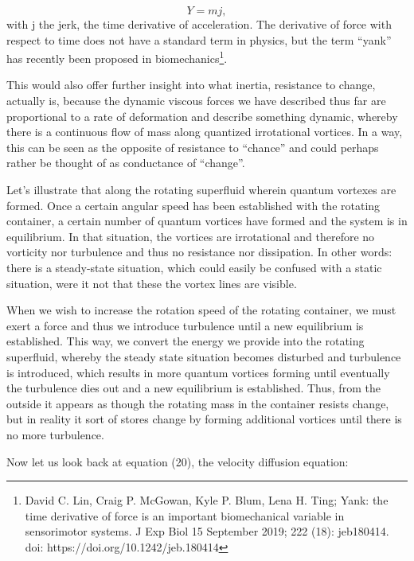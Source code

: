 \documentclass{article}
\begin{document}
\begin{equation}
Y=mj,
\end{equation}
with j the jerk, the time derivative of acceleration. The derivative of force with respect to time does not have a
standard term in physics, but the term ``yank'' has recently been proposed in biomechanics\footnote{ David C. Lin,
Craig P. McGowan, Kyle P. Blum, Lena H. Ting; Yank: the time derivative of force is an important biomechanical variable
in sensorimotor systems. J Exp Biol 15 September 2019; 222 (18): jeb180414. doi: https://doi.org/10.1242/jeb.180414
\par }.

This would also offer further insight into what inertia, resistance to {\textquotedbl}change{\textquotedbl}, actually
is, because the dynamic viscous forces we have described thus far are proportional to a rate of deformation and
describe something dynamic, whereby there is a continuous flow of mass  along quantized irrotational vortices. In a
way, this can be seen as the opposite of resistance to ``chance'' and could perhaps rather be thought of as conductance
of ``change''.

Let's illustrate that along the rotating superfluid wherein quantum vortexes are formed. Once a certain angular speed
has been established with the rotating container, a certain number of quantum vortices have formed and the system is in
equilibrium. In that situation, the vortices are irrotational and therefore no vorticity nor turbulence and thus no
resistance nor dissipation. In other words: there is a steady-state situation, which could easily be confused with a
{\textquotedbl}static{\textquotedbl} situation, were it not that these the vortex lines are visible.

When we wish to increase the rotation speed of the rotating container, we must exert a
{\textquotedbl}force{\textquotedbl} and thus we introduce turbulence until a new equilibrium is established. This way,
we convert the energy we provide into the rotating superfluid, whereby the steady state situation becomes disturbed and
turbulence is introduced, which results in more quantum vortices forming until eventually the turbulence dies out and a
new equilibrium is established. Thus, from the outside it appears as though the rotating mass in the container resists
change, but in reality it sort of stores {\textquotedbl}change{\textquotedbl} by forming additional vortices until
there is no more turbulence.

Now let us look back at equation (20),  the velocity diffusion equation:
\end{document}
